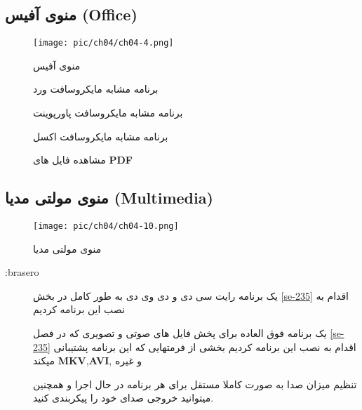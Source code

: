 \subsection{منوی آفیس (Office)}\label{se-382}
\begin{figure}[H]%
	\caption{منوی آفیس}
	\begin{center}
		\texttt{[image: pic/ch04/ch04-4.png]}
	\end{center}
	\label{pic-31}
\end{figure} 
\begin{description}
	\item[] برنامه مشابه مایکروسافت ورد
	\item[] برنامه مشابه مایکروسافت پاورپوینت
	\item[] برنامه مشابه مایکروسافت اکسل
	\item[] مشاهده فایل های 
	\textbf{PDF}
\end{description}
\subsection{منوی مولتی مدیا (Multimedia)}\label{se-383}
\begin{figure}[H]%
	\caption{منوی مولتی مدیا}
	\begin{center}
		\texttt{[image: pic/ch04/ch04-10.png]}
	\end{center}
	\label{pic-32}
\end{figure} 
\begin{description}
	\item[:‫‪brasero‬‬]
	یک برنامه رایت سی دی و دی وی دی به طور کامل در بخش
	\ref{se-235}
	اقدام به نصب این برنامه کردیم
	\item[] 
	یک برنامه فوق العاده برای پخش فایل های صوتی و تصویری که در فصل
\ref{se-235}
	اقدام به نصب این برنامه کردیم
	بخشی از فرمتهایی که این برنامه پشتیبانی میکند
	\textbf{MKV},\textbf{AVI},\textbf{}
	و غیره 
	\item[] تنظیم میزان صدا به صورت کاملا مستقل برای هر برنامه در حال اجرا و همچنین میتوانید خروجی صدای خود را پیکربندی کنید.
\end{description}
